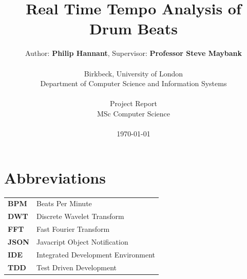\documentclass[a4paper, 11pt]{article}
\date{}
\begin{document}
 

\LARGE\title{Real Time Tempo Analysis of Drum Beats}

\LARGE\author{Author: \textbf{Philip Hannant}, Supervisor: \textbf{Professor Steve Maybank}\\
\\Birkbeck, University of London\\
Department of Computer Science and Information Systems\\
\\Project Report\\
MSc Computer Science\\
\\\monthyeardate\today
}





\normalsize


\maketitle
\newpage
\tableofcontents
\clearpage

\section*{Abbreviations}
\begin{tabular}{l p{4.5in}  }\\
\textbf{BPM} & Beats Per Minute\\
\textbf{DWT} & Discrete Wavelet Transform\\
\textbf{FFT} & Fast Fourier Transform\\
\textbf{JSON} & Javacript Object Notification\\
\textbf{IDE} & Integrated Development Environment\\
\textbf{TDD} & Test Driven Development\\
\end{tabular}
\end{document}
